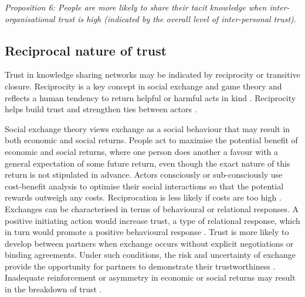 \begin{tcolorbox}
\emph{Proposition 6: People are more likely to share their tacit knowledge when inter-organisational trust is high (indicated by the overall level of inter-personal trust)}.
\end{tcolorbox}

\subsection{Reciprocal nature of trust}

Trust in knowledge sharing networks may be indicated by reciprocity or transitive closure. Reciprocity is a key concept in social exchange and game theory and reflects a human tendency to return helpful or harmful acts in kind \citep{nowak2005evolution}. Reciprocity helps build trust and strengthen ties between actors \citep{blau1964exchange,axelrod1984evolution}. \medskip 

Social exchange theory views exchange as a social behaviour that may result in both economic and social returns. People act to maximise the potential benefit of economic and social returns, where one person does another a favour with a general expectation of some future return, even though the exact nature of this return is not stipulated in advance. Actors consciously or sub-consciously use cost-benefit analysis to optimise their social interactions so that the potential rewards outweigh any costs. Reciprocation is less likely if costs are too high \citep{homans1961social,blau1964exchange}. Exchanges can be characterised in terms of behavioural or relational responses. A positive initiating action would increase trust, a type of relational response, which in turn would promote a positive behavioural response \citep{cropanzano2016social}. Trust is more likely to develop between partners when exchange occurs without explicit negotiations or binding agreements. Under such conditions, the risk and uncertainty of exchange provide the opportunity for partners to demonstrate their trustworthiness  \citep{molm2000risk}. Inadequate reinforcement or asymmetry in economic or social returns may result in the breakdown of trust \citep{homans1961social}. \medskip

